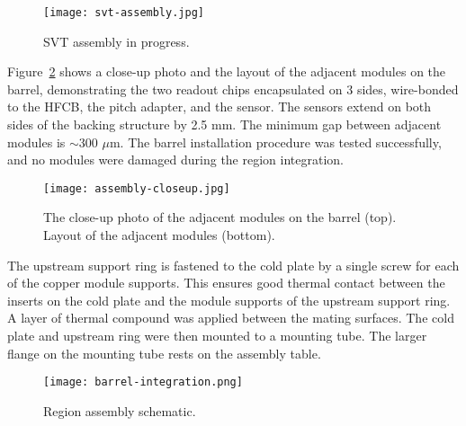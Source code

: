 \begin{figure}[hbt] 
\centering 
\texttt{[image: svt-assembly.jpg]}
\caption{SVT assembly in progress.}
\label{fig:svt-assembly}
\end{figure}

Figure~\ref{fig:assembly-closeup} shows a close-up photo and the layout of the adjacent modules on the barrel, demonstrating the two readout chips encapsulated on 3 sides, wire-bonded to the HFCB, the pitch adapter, and the sensor. The sensors extend on both sides of the backing structure by 2.5 mm. The minimum gap between adjacent modules is $\sim$300 $\mu$m. The barrel installation procedure was tested successfully, and no modules were damaged during the region integration.

\begin{figure}[hbt] 
\centering 
\texttt{[image: assembly-closeup.jpg]}
\caption{The close-up photo of the adjacent modules on the barrel (top). Layout of the adjacent modules (bottom).}
\label{fig:assembly-closeup}
\end{figure}

The upstream support ring is fastened to the cold plate by a single screw for each of the copper module supports. This ensures good thermal contact between the inserts on the cold plate and the module supports of the upstream support ring. A layer of thermal compound was applied between the mating surfaces. The cold plate and upstream ring were then mounted to a mounting tube. The larger flange on the mounting tube rests on the assembly table. 

\begin{figure}[hbt] 
\centering 
\texttt{[image: barrel-integration.png]}
\caption{Region assembly schematic.}
\label{fig:barrel-integration}
\end{figure}

